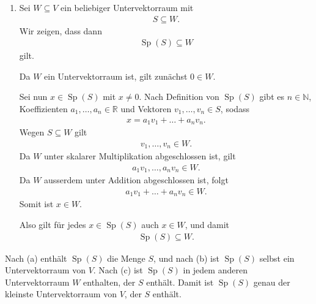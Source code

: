 \documentclass[a4paper,10pt]{article}
\newcommand{\N}{\mathbb{N}}
\newcommand{\R}{\mathbb{R}}
\newcommand{\Sp}{\operatorname{Sp}}
\begin{document}
{\begin{enumerate}[label=(\alph*)]
    Damit erfüllt $\Sp(S)$ alle Untervektorraum-Axiome und ist somit ein Untervektorraum von $V$.

    \item
    Sei $W\subseteq V$ ein beliebiger Untervektorraum mit
    \begin{align*}
        S\subseteq W.
    \end{align*}
    Wir zeigen, dass dann
    \begin{align*}
        \Sp(S)\subseteq W
    \end{align*}
    gilt.

    Da $W$ ein Untervektorraum ist, gilt zunächst $0\in W$.

    Sei nun $x\in\Sp(S)$ mit $x\neq0$. Nach Definition von $\Sp(S)$ gibt es $n\in\N$, Koeffizienten $a_1,\ldots,a_n\in\R$ und Vektoren $v_1,\ldots,v_n\in S$, sodass
    \begin{align*}
        x=a_1v_1+\ldots+a_nv_n.
    \end{align*}
    Wegen $S\subseteq W$ gilt
    \begin{align*}
        v_1,\ldots,v_n\in W.
    \end{align*}
    Da $W$ unter skalarer Multiplikation abgeschlossen ist, gilt
    \begin{align*}
        a_1v_1,\ldots,a_nv_n\in W.
    \end{align*}
    Da $W$ ausserdem unter Addition abgeschlossen ist, folgt
    \begin{align*}
        a_1v_1+\ldots+a_nv_n\in W.
    \end{align*}
    Somit ist $x\in W$.

    Also gilt für jedes $x\in\Sp(S)$ auch $x\in W$, und damit
    \begin{align*}
        \Sp(S)\subseteq W.
    \end{align*}
\end{enumerate}

Nach (a) enthält $\Sp(S)$ die Menge $S$, und nach (b) ist $\Sp(S)$ selbst ein Untervektorraum von $V$. Nach (c) ist $\Sp(S)$ in jedem anderen Untervektorraum $W$ enthalten, der $S$ enthält. Damit ist $\Sp(S)$ genau der kleinste Untervektorraum von $V$, der $S$ enthält.
}
\end{document}
